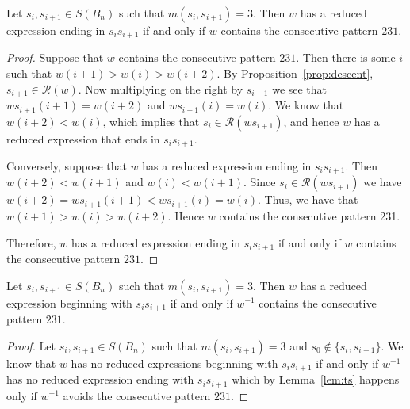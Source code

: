 \begin{lemma}\label{lem:ts}
Let $s_i,s_{i+1} \in S(B_n)$ such that $m(s_i,s_{i+1})=3$. Then $w$ has a reduced expression ending in $s_is_{i+1}$ if and only if $w$ contains the consecutive pattern $231$.
\begin{proof}	
	Suppose that $w$ contains the consecutive pattern $231$. Then there is some $i$ such that $w(i+1)>w(i)>w(i+2)$. By Proposition~\ref{prop:descent}, $s_{i+1} \in \mathcal{R}(w)$. Now multiplying on the right by $s_{i+1}$ we see that $ws_{i+1}(i+1)=w(i+2)$ and $ws_{i+1}(i)=w(i)$. We know that $w(i+2)<w(i)$, which implies that $s_i \in \mathcal{R}(ws_{i+1})$, and hence $w$ has a reduced expression that ends in $s_is_{i+1}$.
	
	 Conversely, suppose that $w$ has a reduced expression ending in $s_is_{i+1}$. Then $w(i+2)<w(i+1)$ and $w(i)<w(i+1)$. Since $s_i \in \mathcal{R}(ws_{i+1})$ we have $w(i+2)=ws_{i+1}(i+1)<ws_{i+1}(i)=w(i)$. Thus, we have that $w(i+1) > w(i) > w(i+2)$. Hence $w$ contains the consecutive pattern 231.
	
	Therefore, $w$ has a reduced expression ending in $s_is_{i+1}$ if and only if $w$ contains the consecutive pattern $231$.
\end{proof}	
\end{lemma}

\begin{corollary}\label{lem:endswithst}
	Let $s_i,s_{i+1} \in S(B_n)$ such that $m(s_i,s_{i+1})=3$. Then $w$ has a reduced expression beginning with $s_is_{i+1}$ if and only if $w^{-1}$ contains the consecutive pattern $231$.
	\begin{proof}
		Let $s_i,s_{i+1} \in S(B_n)$ such that $m(s_i,s_{i+1})=3$ and $s_0 \notin\{s_i,s_{i+1}\}$. We know that $w$ has no reduced expressions beginning with $s_is_{i+1}$ if and only if $w^{-1}$ has no reduced expression ending with $s_is_{i+1}$ which by Lemma~\ref{lem:ts} happens only if $w^{-1}$ avoids the consecutive pattern $231$.
	\end{proof}
\end{corollary}


